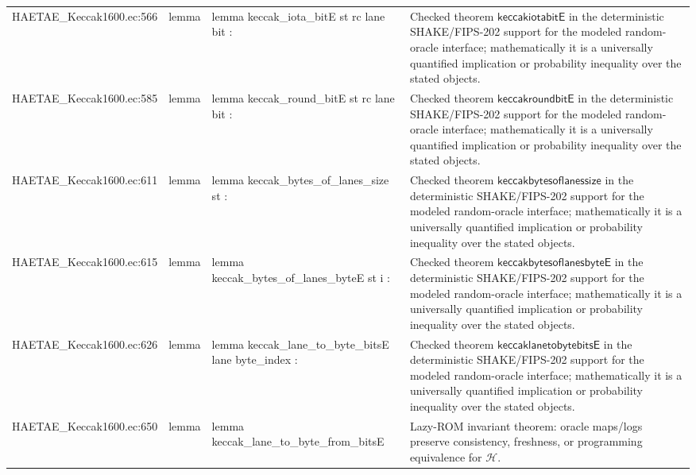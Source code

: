 \documentclass[10pt]{article}
\begin{document}
\begin{longtable}{L{0.11\textwidth}L{0.055\textwidth}L{0.385\textwidth}L{0.41\textwidth}}
HAETAE\_\allowbreak{}Keccak1600.\allowbreak{}ec:\allowbreak{}566 & lemma & {\ttfamily\scriptsize lemma keccak\_\allowbreak{}iota\_\allowbreak{}bitE st rc lane bit :} & Checked theorem $\mathsf{keccakiotabitE}$ in the deterministic SHAKE/FIPS-202 support for the modeled random-oracle interface; mathematically it is a universally quantified implication or probability inequality over the stated objects. \\
HAETAE\_\allowbreak{}Keccak1600.\allowbreak{}ec:\allowbreak{}585 & lemma & {\ttfamily\scriptsize lemma keccak\_\allowbreak{}round\_\allowbreak{}bitE st rc lane bit :} & Checked theorem $\mathsf{keccakroundbitE}$ in the deterministic SHAKE/FIPS-202 support for the modeled random-oracle interface; mathematically it is a universally quantified implication or probability inequality over the stated objects. \\
HAETAE\_\allowbreak{}Keccak1600.\allowbreak{}ec:\allowbreak{}611 & lemma & {\ttfamily\scriptsize lemma keccak\_\allowbreak{}bytes\_\allowbreak{}of\_\allowbreak{}lanes\_\allowbreak{}size st :} & Checked theorem $\mathsf{keccakbytesoflanessize}$ in the deterministic SHAKE/FIPS-202 support for the modeled random-oracle interface; mathematically it is a universally quantified implication or probability inequality over the stated objects. \\
HAETAE\_\allowbreak{}Keccak1600.\allowbreak{}ec:\allowbreak{}615 & lemma & {\ttfamily\scriptsize lemma keccak\_\allowbreak{}bytes\_\allowbreak{}of\_\allowbreak{}lanes\_\allowbreak{}byteE st i :} & Checked theorem $\mathsf{keccakbytesoflanesbyteE}$ in the deterministic SHAKE/FIPS-202 support for the modeled random-oracle interface; mathematically it is a universally quantified implication or probability inequality over the stated objects. \\
HAETAE\_\allowbreak{}Keccak1600.\allowbreak{}ec:\allowbreak{}626 & lemma & {\ttfamily\scriptsize lemma keccak\_\allowbreak{}lane\_\allowbreak{}to\_\allowbreak{}byte\_\allowbreak{}bitsE lane byte\_\allowbreak{}index :} & Checked theorem $\mathsf{keccaklanetobytebitsE}$ in the deterministic SHAKE/FIPS-202 support for the modeled random-oracle interface; mathematically it is a universally quantified implication or probability inequality over the stated objects. \\
HAETAE\_\allowbreak{}Keccak1600.\allowbreak{}ec:\allowbreak{}650 & lemma & {\ttfamily\scriptsize lemma keccak\_\allowbreak{}lane\_\allowbreak{}to\_\allowbreak{}byte\_\allowbreak{}from\_\allowbreak{}bitsE} & Lazy-ROM invariant theorem: oracle maps/logs preserve consistency, freshness, or programming equivalence for $\mathcal H$. \\

\end{longtable}
\end{document}
